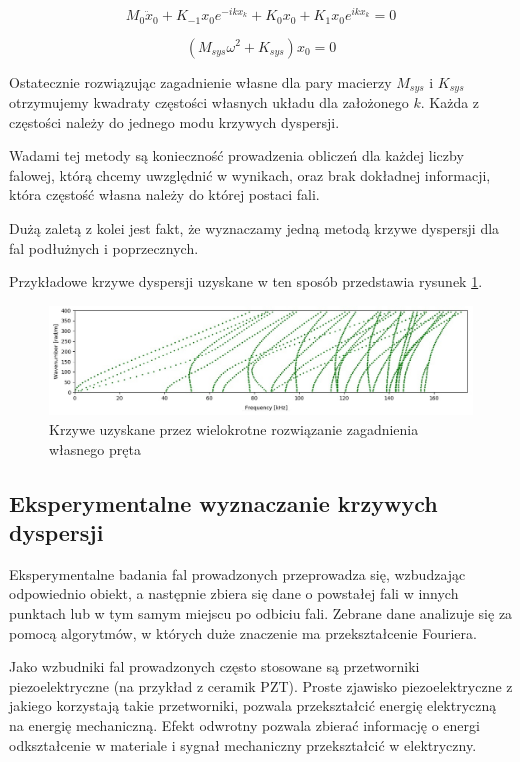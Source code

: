 \begin{equation} \label{eq:MES5}
M_0\ddot x_0 + K_{-1} x_0 e^{-ikx_k} + K_0 x_0 + K_1 x_0 e^{ikx_k} = 0
\end{equation}

\begin{equation} \label{eq:MES6}
 (M_{sys}\omega^2 + K_{sys})x_0 = 0
\end{equation}

Ostatecznie rozwiązując zagadnienie własne dla pary macierzy \( M_{sys} \) i \( K_{sys} \) otrzymujemy kwadraty częstości własnych układu dla założonego \( k \). Każda z częstości należy do jednego modu krzywych dyspersji.

Wadami tej metody są konieczność prowadzenia obliczeń dla każdej liczby falowej, którą chcemy uwzględnić w wynikach, oraz brak dokładnej informacji, która częstość własna należy do której postaci fali.

Dużą zaletą z kolei jest fakt, że wyznaczamy jedną metodą krzywe dyspersji dla fal podłużnych i poprzecznych.

Przykładowe krzywe dyspersji uzyskane w ten sposób przedstawia rysunek \ref{fig:przykladowe_krzywe}.

\begin{figure}[h]
\centering
\includegraphics[width=14cm]{Zdjecia/2/przykladowe_krzywe}
\caption{Krzywe uzyskane przez wielokrotne rozwiązanie zagadnienia własnego pręta}
\label{fig:przykladowe_krzywe}
\end{figure}


\subsection{Eksperymentalne wyznaczanie krzywych dyspersji}

Eksperymentalne badania fal prowadzonych przeprowadza się, wzbudzając odpowiednio obiekt, a następnie zbiera się dane o powstałej fali w innych punktach lub w tym samym miejscu po odbiciu fali. Zebrane dane analizuje się za pomocą algorytmów, w których duże znaczenie ma przekształcenie Fouriera.

Jako wzbudniki fal prowadzonych często stosowane są przetworniki piezoelektryczne (na przykład z ceramik PZT). Proste zjawisko piezoelektryczne z jakiego korzystają takie przetworniki, pozwala przekształcić energię elektryczną na energię mechaniczną. Efekt odwrotny pozwala zbierać informację o energi odkształcenie w materiale i sygnał mechaniczny przekształcić w elektryczny. 

